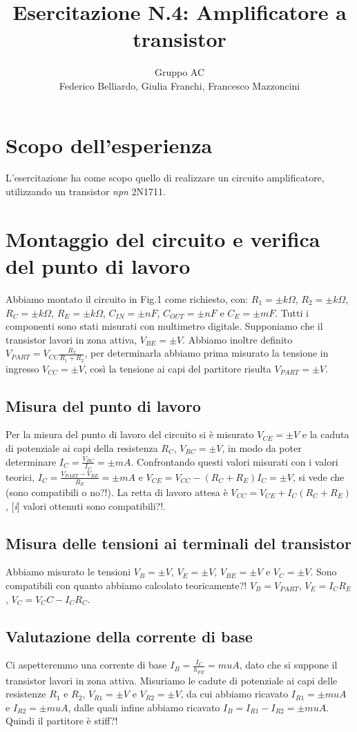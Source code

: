 \documentclass[10pt,a4paper]{article}
\author{Gruppo AC \\ Federico Belliardo, Giulia Franchi, Francesco Mazzoncini}
\title{Esercitazione N.4: Amplificatore a transistor}
\newcommand{\rem}[1]{[\emph{#1}]}
\begin{document}
\maketitle

\section{Scopo dell'esperienza}
L'esercitazione ha come scopo quello di realizzare un circuito amplificatore, utilizzando un transistor \textit{npn} 2N1711.

\section{Montaggio del circuito e verifica del punto di lavoro}
Abbiamo montato il circuito in Fig.1 come richiesto, con: $R_1= \pm k\Omega$, $R_2= \pm k\Omega$, $R_C= \pm k\Omega$, $R_E= \pm k\Omega$, $C_{IN}= \pm nF$, $C_{OUT}= \pm nF$ e $C_E= \pm mF$. Tutti i componenti sono stati misurati con multimetro digitale.
Supponiamo che il transistor lavori in zona attiva, $V_{BE}= \pm V$. Abbiamo inoltre definito $V_{PART}=V_{CC}\frac{R_2}{R_1+R_2}$, per determinarla abbiamo prima misurato la tensione in ingresso $V_{CC}= \pm V$, così la tensione ai capi del partitore risulta $V_{PART}= \pm V$.


\subsection{Misura del punto di lavoro}
Per la misura del punto di lavoro del circuito si è misurato $V_{CE}= \pm V$ e la caduta di potenziale ai capi della resistenza $R_C$, $V_{RC}= \pm V$, in modo da poter determinare $I_C=\frac{V_{RC}}{I_C}= \pm mA$. Confrontando questi valori misurati con i valori teorici, $I_C=\frac{V_{PART}-V_{BE}}{R_E}= \pm mA$ e $V_{CE}=V_{CC}-(R_C+R_E)I_C= \pm V$, si vede che (sono compatibili o no?!).
La retta di lavoro attesa è $V_{CC}=V_{CE}+I_C(R_C+R_E)$, \rem i valori ottenuti sono compatibili?!.

\subsection{Misura delle tensioni ai terminali del transistor}
Abbiamo misurato le tensioni $V_B= \pm V$, $V_E= \pm V$, $V_{BE}= \pm V$ e $V_C= \pm V$. Sono compatibili con quanto abbiamo calcolato teoricamente?! $V_B= V_{PART}$, $V_E=I_C R_E$, $V_C=V_CC-I_C R_C$.

\subsection{Valutazione della corrente di base}
Ci aspetteremmo una corrente di base $I_B=\frac{I_C}{h_{FE}}= muA$, dato che si suppone il transistor lavori in zona attiva. Misuriamo le cadute di potenziale ai capi delle resistenze $R_1$ e $R_2$, $V_{R1}= \pm V$ e $V_{R2}= \pm V$, da cui abbiamo ricavato $I_{R1}= \pm muA$ e $I_{R2}= \pm muA$, dalle quali infine abbiamo ricavato $I_B=I_{R1}-I_{R2}= \pm muA$. Quindi il partitore è stiff?!
\end{document}

